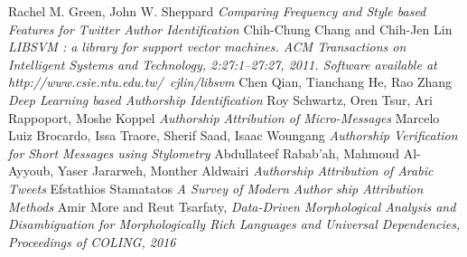 \documentclass[a4paper]{article}
\begin{document}
\begin{thebibliography}{9}
	Rachel M. Green, John W. Sheppard
	\textit{Comparing Frequency and Style based Features for Twitter Author Identification}
	Chih-Chung Chang and Chih-Jen Lin
	\textit{LIBSVM : a library for support vector machines. ACM Transactions on Intelligent Systems and Technology, 2:27:1--27:27, 2011. Software available at http://www.csie.ntu.edu.tw/~cjlin/libsvm}
	Chen Qian, Tianchang He, Rao Zhang
	\textit{Deep Learning based Authorship Identification}
	Roy Schwartz, Oren Tsur, Ari Rappoport, Moshe Koppel
	\textit{Authorship Attribution of Micro-Messages}
	Marcelo Luiz Brocardo, Issa Traore, Sherif Saad, Isaac Woungang
	\textit{Authorship Verification for Short Messages using Stylometry}
	Abdullateef Rabab’ah, Mahmoud Al-Ayyoub, Yaser Jararweh, Monther Aldwairi
	\textit{Authorship Attribution of Arabic Tweets}
	Efstathios Stamatatos
	\textit{A Survey of Modern Author ship Attribution Methods}
	Amir More and Reut Tsarfaty,
	\textit{Data-Driven Morphological Analysis and Disambiguation for Morphologically Rich Languages and Universal Dependencies, Proceedings of COLING, 2016}
\end{thebibliography}
\end{document}
